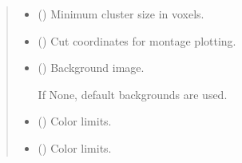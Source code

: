 \documentclass[letterpaper,10pt,english]{sphinxhowto}
\begin{document}
\begin{fulllineitems}
\begin{quote}
\begin{description}
\begin{itemize}
\item {} 
\sphinxAtStartPar
{} (\sphinxstyleliteralemphasis{\sphinxupquote{, }}) \textendash{} Minimum cluster size in voxels.

\item {} 
\sphinxAtStartPar
{} (\sphinxstyleliteralemphasis{\sphinxupquote{, }}\sphinxstyleliteralemphasis{\sphinxupquote{, }}\sphinxstyleliteralemphasis{\sphinxupquote{(}}\sphinxstyleliteralemphasis{\sphinxupquote{, }}\sphinxstyleliteralemphasis{\sphinxupquote{, }}\sphinxstyleliteralemphasis{\sphinxupquote{)}}) \textendash{} Cut coordinates for montage plotting.

\item {} 
\sphinxAtStartPar
{} (\sphinxstyleliteralemphasis{\sphinxupquote{, }}\sphinxstyleliteralemphasis{\sphinxupquote{, }}) \textendash{} 
\sphinxAtStartPar
Background image.

\sphinxAtStartPar
If None, default backgrounds are used.


\item {} 
\sphinxAtStartPar
{} (\sphinxstyleliteralemphasis{\sphinxupquote{, }}) \textendash{} Color limits.

\item {} 
\sphinxAtStartPar
{} (\sphinxstyleliteralemphasis{\sphinxupquote{, }}) \textendash{} Color limits.


\end{itemize}
\end{description}
\end{quote}
\end{fulllineitems}
\end{document}
